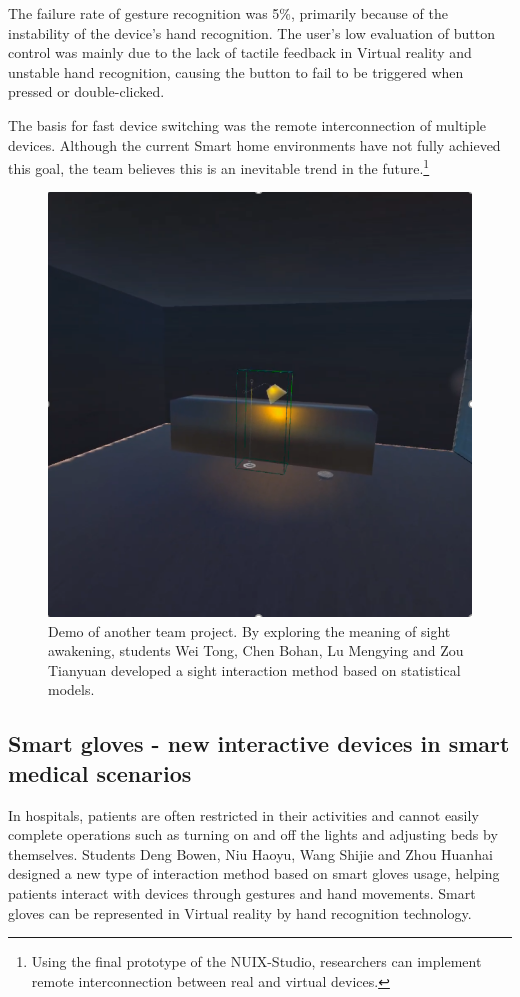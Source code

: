 The failure rate of gesture recognition was 5\%, primarily because of the instability of the device's hand recognition. The user's low evaluation of button control was mainly due to the lack of tactile feedback in Virtual reality and unstable hand recognition, causing the button to fail to be triggered when pressed or double-clicked.

The basis for fast device switching was the remote interconnection of multiple devices. Although the current Smart home environments have not fully achieved this goal, the team believes this is an inevitable trend in the future.\footnote{Using the final prototype of the NUIX-Studio, researchers can implement remote interconnection between real and virtual devices.}

\begin{figure}
  \centering
  \includegraphics[width=0.6\linewidth]{figures/Project_10.png}
  \caption{Demo of another team project. By exploring the meaning of sight awakening, students Wei Tong, Chen Bohan, Lu Mengying and Zou Tianyuan developed a sight interaction method based on statistical models. }
  \label{fig:Project10-figure}
\end{figure}

\subsection{Smart gloves -  new interactive devices in smart medical scenarios}

In hospitals, patients are often restricted in their activities and cannot easily complete operations such as turning on and off the lights and adjusting beds by themselves. Students Deng Bowen, Niu Haoyu, Wang Shijie and Zhou Huanhai designed a new type of interaction method based on smart gloves usage, helping patients interact with devices through gestures and hand movements. Smart gloves can be represented in Virtual reality by hand recognition technology.

